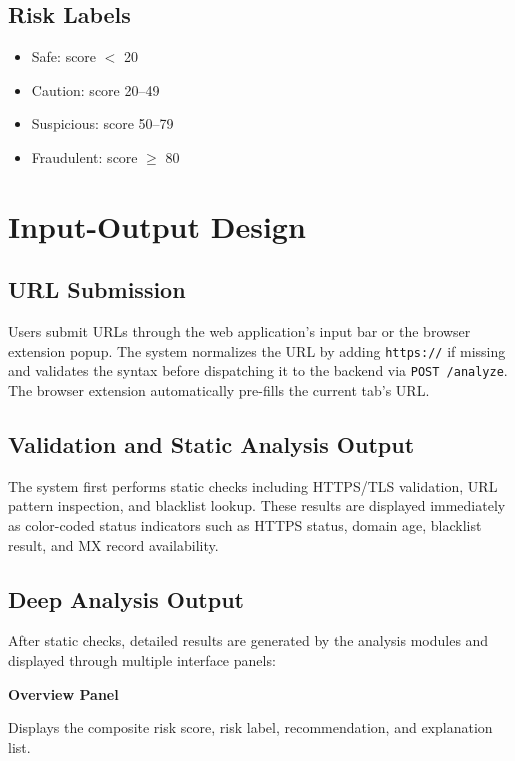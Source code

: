 \subsection{Risk Labels}

\begin{itemize}
\item Safe: score $<$ 20
\item Caution: score 20–49
\item Suspicious: score 50–79
\item Fraudulent: score $\geq$ 80
\end{itemize}

\section{Input-Output Design}

\subsection{URL Submission}

Users submit URLs through the web application's input bar or the browser extension popup. The system normalizes the URL by adding \texttt{https://} if missing and validates the syntax before dispatching it to the backend via \texttt{POST /analyze}. The browser extension automatically pre-fills the current tab's URL.

\subsection{Validation and Static Analysis Output}

The system first performs static checks including HTTPS/TLS validation, URL pattern inspection, and blacklist lookup. These results are displayed immediately as color-coded status indicators such as HTTPS status, domain age, blacklist result, and MX record availability.

\subsection{Deep Analysis Output}

After static checks, detailed results are generated by the analysis modules and displayed through multiple interface panels:

\textbf{Overview Panel}

Displays the composite risk score, risk label, recommendation, and explanation list.

